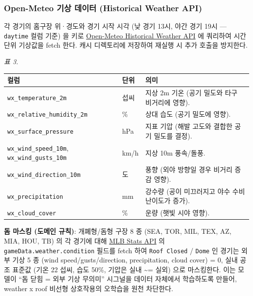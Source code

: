 \documentclass[
  11.5pt,
]{article}
\begin{document}
\subsubsection{Open-Meteo 기상 데이터 (Historical Weather
API)}\label{open-meteo-uxae30uxc0c1-uxb370uxc774uxd130-historical-weather-api}

각 경기의 홈구장 위·경도와 경기 시작 시각 (낮 경기 13시, 야간 경기 19시
--- \texttt{daytime} 컬럼 기준) 을 키로
\href{https://archive-api.open-meteo.com/v1/archive}{Open-Meteo
Historical Weather API} 에 쿼리하여 시간 단위 기상값을 fetch 한다. 캐시
디렉토리에 저장하여 재실행 시 추가 호출을 방지한다.

\emph{표 3.}

\begin{longtable}[]{@{}
  >{\raggedright\arraybackslash}p{}
  >{\raggedright\arraybackslash}p{}
  >{\raggedright\arraybackslash}p{}@{}}
\toprule\noalign{}
\begin{minipage}[b]{\linewidth}\raggedright
컬럼
\end{minipage} & \begin{minipage}[b]{\linewidth}\raggedright
단위
\end{minipage} & \begin{minipage}[b]{\linewidth}\raggedright
의미
\end{minipage} \\
\midrule\noalign{}
\endhead
\bottomrule\noalign{}
\endlastfoot
\texttt{wx\_temperature\_2m} & 섭씨 & 지상 2m 기온 (공기 밀도와 타구
비거리에 영향). \\
\texttt{wx\_relative\_humidity\_2m} & \% & 상대 습도 (공기 밀도에
영향). \\
\texttt{wx\_surface\_pressure} & hPa & 지표 기압 (해발 고도와 결합한
공기 밀도를 결정). \\
\texttt{wx\_wind\_speed\_10m}, \texttt{wx\_wind\_gusts\_10m} & km/h &
지상 10m 풍속/돌풍. \\
\texttt{wx\_wind\_direction\_10m} & 도 & 풍향 (외야 방향일 경우 비거리
증감 영향). \\
\texttt{wx\_precipitation} & mm & 강수량 (공이 미끄러지고 야수 수비
난이도가 증가). \\
\texttt{wx\_cloud\_cover} & \% & 운량 (햇빛 시야 영향). \\
\end{longtable}

\textbf{돔 마스킹 (도메인 규칙)}: 개폐형/돔형 구장 8 종 (SEA, TOR, MIL,
TEX, AZ, MIA, HOU, TB) 의 각 경기에 대해
\href{https://statsapi.mlb.com/api/v1/people}{MLB Stats API} 의
\texttt{gameData.weather.condition} 필드를 fetch 하여
\texttt{Roof\ Closed} / \texttt{Dome} 인 경기는 외부 기상 5 종 (wind
speed/gusts/direction, precipitation, cloud cover) = 0, 실내 공조 표준값
(기온 22 섭씨, 습도 50\%, 기압은 실내 \textasciitilde= 실외) 으로
마스킹한다. 이는 모델이 ``돔 닫힘 = 외부 기상 무의미'' 시그널을 데이터
자체에서 학습하도록 만들어, weather x roof 비선형 상호작용의 오학습을
원천 차단한다.
\end{document}
